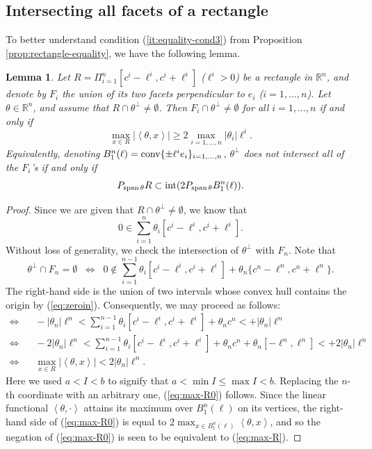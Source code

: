 \documentclass[11pt]{article}
\newtheorem{lemma}[thm]{Lemma}
\theoremstyle{definition}
\theoremstyle{proof}
\DeclareMathOperator{\+}{\mathop{\tilde{+}}}
\DeclareMathOperator{\interior}{\textnormal{int}}
\DeclareMathOperator{\conv}{\textnormal{conv}}
\DeclareMathOperator{\sspan}{\textnormal{span}}
\newcommand{\abs}[1]{\left\vert#1\right\vert}
\newcommand{\scalar}[1]{\left \langle #1 \right \rangle}
\newcommand{\R}{\mathbb{R}}
\newcommand{\h}{\ell}
\numberwithin{equation}{section}
\numberwithin{equation}{section}
\begin{document}
\subsection{Intersecting all facets of a rectangle}

To better understand condition (\ref{it:equality-cond3}) from Proposition \ref{prop:rectangle-equality}, we have the following lemma. 

\begin{lemma} \label{lem:all-facets}
Let $R = \Pi_{i=1}^n [c^i - \h^i , c^i + \h^i]$ ($\h^i > 0$) be a rectangle in $\R^n$, and denote by $F_i$ the union of its two facets perpendicular to $e_i$ ($i=1,\ldots,n$). Let $\theta \in \R^n$, and assume that $R \cap \theta^{\perp} \neq \emptyset$. Then $ F_i \cap \theta^{\perp} \neq \emptyset$ for all $i=1,\ldots,n$ if and only if
\begin{equation} \label{eq:max-R0}
 \max_{x \in R} \abs{\scalar{\theta,x}} \geq 2 \max_{i=1,\ldots,n} |\theta_i| \h^i  .
 \end{equation}
 Equivalently, denoting $B^n_1(\h) = \conv\{\pm \h^i e_i\}_{i=1,\ldots,n}$, $\theta^{\perp}$ does not intersect all of the $F_i$'s if and only if
 \begin{equation} \label{eq:max-R}
 P_{\sspan \theta} R  \subset \interior(2 P_{\sspan \theta} B^n_1(\h)) . 
 \end{equation}
 \end{lemma}
 \begin{proof}
 Since we are given that $R \cap \theta^{\perp} \neq \emptyset$, we know that
 \begin{equation} \label{eq:zeroin}
 0 \in \sum_{i=1}^{n} \theta_i [c^i - \h^i, c^i + \h^i] . 
 \end{equation}
 Without loss of generality, we check the intersection of $\theta^{\perp}$ with $F_n$. 
 Note that
 \[
\theta^{\perp} \cap F_n = \emptyset \;\; \Leftrightarrow \;\; 0 \notin \sum_{i=1}^{n-1} \theta_i [c^i - \h^i, c^i + \h^i] + \theta_n \{ c^n - \h^n , c^n + \h^n \} .
 \]
 The right-hand side is the union of two intervals whose convex hull contains the origin by (\ref{eq:zeroin}). 
Consequently, we may proceed as follows:
 \begin{align*}
  \Leftrightarrow \; & \; \;  - \abs{\theta_n} \h^n  < \sum_{i=1}^{n-1} \theta_i [c^i - \h^i, c^i + \h^i] + \theta_n c^n < +  \abs{\theta_n} \h^n \\
 \Leftrightarrow \; & \; \;  - 2  \abs{\theta_n} \h^n  < \sum_{i=1}^{n-1} \theta_i [c^i - \h^i, c^i + \h^i] + \theta_n c^n + \theta_n [-\h^n, \h^n]  < +2  \abs{\theta_n} \h^n
 \\
 \Leftrightarrow \; & \; \;  \max_{x \in R} \abs{\scalar{\theta,x}} < 2 \abs{\theta_n} \h^n . 
 \end{align*}
Here we used $a < I < b$ to signify that $a < \min I \leq \max I < b$. 
Replacing the $n$-th coordinate with an arbitrary one, (\ref{eq:max-R0}) follows.  Since
 the linear functional $\scalar{\theta,\cdot}$ attains its maximum over $B^n_1(\h)$ on its vertices, the right-hand side of (\ref{eq:max-R0}) is equal to $2 \max_{x \in B^n_1(\h)} \scalar{\theta, x}$, and so the negation of (\ref{eq:max-R0}) is seen to be equivalent to (\ref{eq:max-R}). 
 \end{proof}
 
\end{document}
